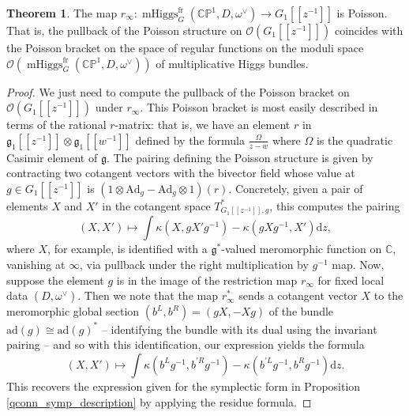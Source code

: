 \documentclass[11pt, oneside, reqno]{amsart}
\theoremstyle{definition} \newtheorem{definition}{Definition}[section]
\newtheorem{theorem}[definition]{Theorem}
\theoremstyle{definition} \newtheorem{remark}[definition]{Remark}
\theoremstyle{definition} \newtheorem{remarks}[definition]{Remarks}
\theoremstyle{definition} \newtheorem{question}[definition]{Question}
\theoremstyle{definition} \newtheorem*{note}{Note}
\theoremstyle{definition} \newtheorem{example}[definition]{Example}
\theoremstyle{definition} \newtheorem{examples}[definition]{Examples}
\renewcommand{\gg}{\mathfrak{g}}
\newcommand{\bb}[1]{\mathbb{#1}}
\newcommand{\mr}[1]{\mathrm{#1}}
\newcommand{\CC}{\mathbb{C}}
\newcommand{\OO}{\mathcal{O}}
\newcommand{\iso}{\cong}
\DeclareMathOperator{\mhiggs}{mHiggs}
\renewcommand{\d}{\mathrm{d}}
\newcommand{\fr}{\mathrm{fr}}
\newcommand{\ad}{\mr{ad}}
\newcommand{\Ad}{\mr{Ad}}
\begin{document}
\begin{theorem} \label{Poisson_Lie_Comparison_thm}
The map $r_\infty \colon \mhiggs^\fr_G(\bb{CP}^1,D,\omega^\vee) \to G_1[[z^{-1}]]$ is Poisson.  That is, the pullback of the Poisson structure on $\OO(G_1[[z^{-1}]])$ coincides with the Poisson bracket on the space of regular functions on the moduli space $\OO(\mhiggs^\fr_G(\bb{CP}^1,D,\omega^\vee))$ of multiplicative Higgs bundles. 
\end{theorem}

\begin{proof}
We just need to compute the pullback of the Poisson bracket on $\OO(G_1[[z^{-1}]])$ under $r_\infty$.  This Poisson bracket is most easily described in terms of the rational $r$-matrix: that is, we have an element $r$ in $\gg_1[[z^{-1}]] \otimes \gg_1[[w^{-1}]]$ defined by the formula $\frac \Omega {z-w}$ where $\Omega$ is the quadratic Casimir element of $\gg$.  The pairing defining the Poisson structure is given by contracting two cotangent vectors with the bivector field whose value at $g \in G_1[[z^{-1}]]$ is $(1 \otimes \Ad_g - \Ad_g \otimes 1)(r)$.  Concretely, given a pair of elements $X$ and $X'$ in the cotangent space $T^*_{G_1[[z^{-1}]], g}$, this computes the pairing
\[(X, X') \mapsto \int \kappa(X, g X' g^{-1}) - \kappa(g X g^{-1},X')\d z,\]
where $X$, for example, is identified with a $\gg^*$-valued meromorphic function on $\CC$, vanishing at $\infty$, via pullback under the right multiplication by $g^{-1}$ map.  Now, suppose the element $g$ is in the image of the restriction map $r_\infty$ for fixed local data $(D,\omega^\vee)$.  Then we note that the map $r_\infty^*$ sends a cotangent vector $X$ to the meromorphic global section $(b^L, b^R) = (gX, -Xg)$ of the bundle $\ad(g) \iso \ad(g)^*$ -- identifying the bundle with its dual using the invariant pairing  -- and so with this identification, our expression yields the formula
\[(X,X') \mapsto \int \kappa(b^Lg^{-1}, b^{'R}g^{-1}) - \kappa(b^{'L}g^{-1}, b^{R}g^{-1})\d z.\]
This recovers the expression given for the symplectic form in Proposition \ref{qconn_symp_description} by applying the residue formula.
\end{proof}
\end{document}
